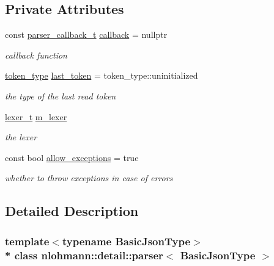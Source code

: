\subsection*{Private Attributes}
\begin{DoxyCompactItemize}
\item 
const \hyperlink{classnlohmann_1_1detail_1_1parser_ad250ad4f2b4af4a497e727c963162ff1}{parser\+\_\+callback\+\_\+t} \hyperlink{classnlohmann_1_1detail_1_1parser_a7600d272ec605e3ffdc8512b3585f476}{callback} = nullptr
\begin{DoxyCompactList}\small\item\em callback function \end{DoxyCompactList}\item 
\hyperlink{classnlohmann_1_1detail_1_1parser_a21d247111b332785b7acf3f8e487d117}{token\+\_\+type} \hyperlink{classnlohmann_1_1detail_1_1parser_a932e49f6f4d291557846744319245994}{last\+\_\+token} = token\+\_\+type\+::uninitialized
\begin{DoxyCompactList}\small\item\em the type of the last read token \end{DoxyCompactList}\item 
\hyperlink{classnlohmann_1_1detail_1_1parser_a16030c5af158a94d1c799f82ff3a0147}{lexer\+\_\+t} \hyperlink{classnlohmann_1_1detail_1_1parser_a22dcc815551a4052b87797b34171b352}{m\+\_\+lexer}
\begin{DoxyCompactList}\small\item\em the lexer \end{DoxyCompactList}\item 
const bool \hyperlink{classnlohmann_1_1detail_1_1parser_a3de1ea054cfa606e79fa07741f081b5f}{allow\+\_\+exceptions} = true
\begin{DoxyCompactList}\small\item\em whether to throw exceptions in case of errors \end{DoxyCompactList}\end{DoxyCompactItemize}


\subsection{Detailed Description}
\subsubsection*{template$<$typename Basic\+Json\+Type$>$\\*
class nlohmann\+::detail\+::parser$<$ Basic\+Json\+Type $>$}

